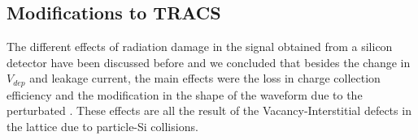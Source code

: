 
\subsection{Modifications to TRACS}

The different effects of radiation damage in the signal obtained from a silicon detector have been discussed before and we concluded that besides the change in $V_{dep}$ and leakage current, the main effects were the loss in charge collection efficiency and the modification in the shape of the waveform due to the perturbated \neff. These effects are all the result of the Vacancy-Interstitial defects in the lattice due to particle-Si collisions.




